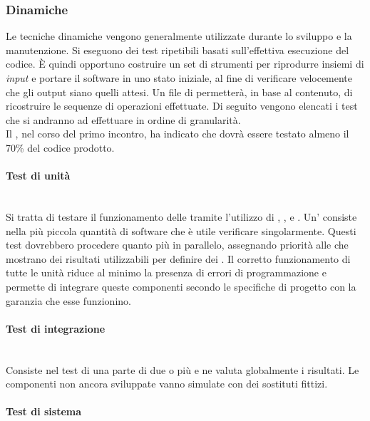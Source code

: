 		\subsubsection{Dinamiche}

		Le tecniche dinamiche vengono generalmente utilizzate durante lo sviluppo e la manutenzione. Si eseguono dei test ripetibili basati sull'effettiva esecuzione del codice. È quindi opportuno costruire un set di strumenti per riprodurre insiemi di \emph{input} e portare il software in uno stato iniziale, al fine di verificare velocemente che gli output siano quelli attesi. Un file di  permetterà, in base al contenuto, di ricostruire le sequenze di operazioni effettuate. Di seguito vengono elencati i test che si andranno ad effettuare in ordine di granularità.\\
		Il , nel corso del primo incontro, ha indicato che dovrà essere testato almeno il  70\% del codice prodotto.
		
			\paragraph{Test di unità} \mbox{} \\

			Si tratta di testare il funzionamento delle  tramite l'utilizzo di , , e . Un' consiste nella più piccola quantità di software che è utile verificare singolarmente.
			Questi test dovrebbero procedere quanto più in parallelo, assegnando priorità alle  che mostrano dei risultati utilizzabili per definire dei . Il corretto funzionamento di tutte le unità riduce al minimo la presenza di errori di programmazione e permette di integrare queste componenti secondo le specifiche di progetto con la garanzia che esse funzionino.
			 
			\paragraph{Test di integrazione} \mbox{} \\

			Consiste nel test di una parte di due o più  e ne valuta globalmente i risultati. Le componenti non ancora sviluppate vanno simulate con dei sostituti fittizi.
			
			\paragraph{Test di sistema} \mbox{} \\

